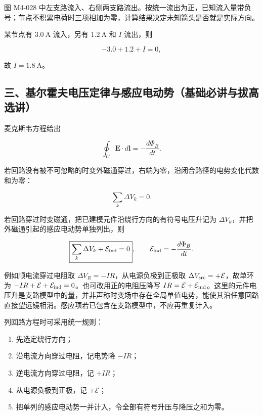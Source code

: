 图 M4-028
中左支路流入、右侧两支路流出。按统一流出为正，已知流入量带负号；节点不积累电荷时三项相加为零，计算结果决定未知箭头是否就是实际方向。

某节点有 \(3.0\ \mathrm A\) 流入，另有 \(1.2\ \mathrm A\) 和 \(I\)
流出，则

\[
-3.0+1.2+I=0,
\]

故 \(I=1.8\ \mathrm A\)。

\subsection{三、基尔霍夫电压定律与感应电动势（基础必讲与拔高选讲）}\label{m4:ux4e09ux57faux5c14ux970dux592bux7535ux538bux5b9aux5f8bux4e0eux611fux5e94ux7535ux52a8ux52bfux57faux7840ux5fc5ux8bb2ux4e0eux62d4ux9ad8ux9009ux8bb2}

麦克斯韦方程给出

\[
\oint_C\mathbf E\cdot d\mathbf l
=-\frac{d\Phi_B}{dt}.
\]

若回路没有被不可忽略的时变外磁通穿过，右端为零，沿闭合路径的电势变化代数和为零：

\[
\boxed{
\sum_k \Delta V_k=0
}.
\]

若回路穿过时变磁通，把已建模元件沿绕行方向的有符号电压升记为
\(\Delta V_k\)，并把外磁通引起的感应电动势单独列出，则

\[
\boxed{\sum_k\Delta V_k+\mathcal E_{\rm ind}=0},
\qquad \mathcal E_{\rm ind}=-\frac{d\Phi_B}{dt}.
\]

例如顺电流穿过电阻取 \(\Delta V_R=-IR\)，从电源负极到正极取
\(\Delta V_{\rm src}=+\mathcal E\)，故单环为
\(-IR+\mathcal E+\mathcal E_{\rm ind}=0\)。也可改用正的电阻压降写
\(IR=\mathcal E+\mathcal E_{\rm ind}\)。这里的元件电压升是支路模型中的量，并非声称时变场中存在全局单值电势，能使其沿任意回路直接望远镜相消。感应项若已包含在支路模型中，不应再重复计入。

列回路方程时可采用统一规则：

\begin{enumerate}
\def\labelenumi{\arabic{enumi}.}
\tightlist
\item
  先选定绕行方向；
\item
  沿电流方向穿过电阻，记电势降 \(-IR\)；
\item
  逆电流方向穿过电阻，记 \(+IR\)；
\item
  从电源负极到正极，记 \(+\mathcal E\)；
\item
  把单列的感应电动势一并计入，令全部有符号升压与降压之和为零。
\end{enumerate}

